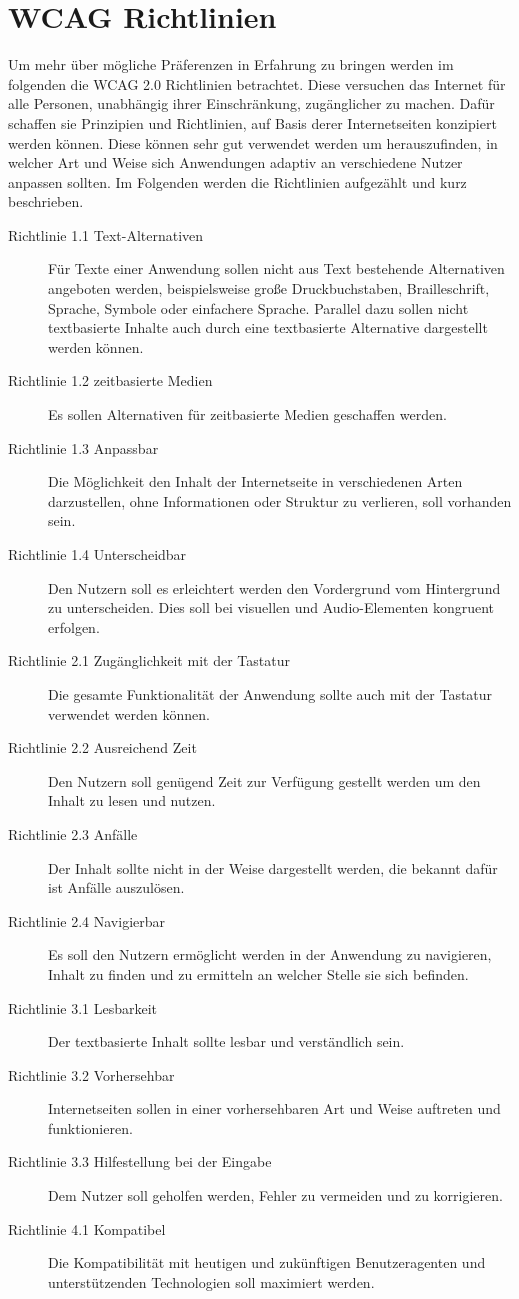 \documentclass[12pt, paper=a4, bibtotoc, toc=listof, headsepline=true, numbers=endperiod]{scrreprt}
\begin{document}
\section{WCAG Richtlinien}
Um mehr über mögliche Präferenzen in Erfahrung zu bringen werden im folgenden die \ac{WCAG 2.0} Richtlinien betrachtet. Diese versuchen das Internet für alle Personen, unabhängig ihrer Einschränkung, zugänglicher zu machen. Dafür schaffen sie Prinzipien und Richtlinien, auf Basis derer Internetseiten konzipiert werden können. Diese können sehr gut verwendet werden um herauszufinden, in welcher Art und Weise sich Anwendungen adaptiv an verschiedene Nutzer anpassen sollten. Im Folgenden werden die Richtlinien aufgezählt und kurz beschrieben\cite{wcag}.
\begin{description}
	\item [Richtlinie 1.1 Text-Alternativen] Für Texte einer Anwendung sollen nicht aus Text bestehende Alternativen angeboten werden, beispielsweise große Druckbuchstaben, Brailleschrift, Sprache, Symbole oder einfachere Sprache. Parallel dazu sollen nicht textbasierte Inhalte auch durch eine textbasierte Alternative dargestellt werden können.
	\item[Richtlinie 1.2 zeitbasierte Medien] Es sollen Alternativen für zeitbasierte Medien geschaffen werden.
	\item[Richtlinie 1.3 Anpassbar] Die Möglichkeit den Inhalt der Internetseite in verschiedenen Arten darzustellen, ohne Informationen oder Struktur zu verlieren, soll vorhanden sein.
	\item[Richtlinie 1.4 Unterscheidbar] Den Nutzern soll es erleichtert werden den Vordergrund vom Hintergrund zu unterscheiden. Dies soll bei visuellen und Audio-Elementen kongruent erfolgen. 
	\item[Richtlinie 2.1 Zugänglichkeit mit der Tastatur] Die gesamte Funktionalität der Anwendung sollte auch mit der Tastatur verwendet werden können.	
	\item[Richtlinie 2.2 Ausreichend Zeit] Den Nutzern soll genügend Zeit zur Verfügung gestellt werden um den Inhalt zu lesen und nutzen.
	\item[Richtlinie 2.3 Anfälle] Der Inhalt sollte nicht in der Weise dargestellt werden, die bekannt dafür ist Anfälle auszulösen.
	\item[Richtlinie 2.4 Navigierbar] Es soll den Nutzern ermöglicht werden in der Anwendung zu navigieren, Inhalt zu finden und zu ermitteln an welcher Stelle sie sich befinden.
	\item[Richtlinie 3.1 Lesbarkeit] Der textbasierte Inhalt sollte lesbar und verständlich sein.	
	\item[Richtlinie 3.2 Vorhersehbar] Internetseiten sollen in einer vorhersehbaren Art und Weise auftreten und funktionieren.
	\item[Richtlinie 3.3 Hilfestellung bei der Eingabe] Dem Nutzer soll geholfen werden, Fehler zu vermeiden und zu korrigieren.
	\item[Richtlinie 4.1 Kompatibel] Die Kompatibilität mit heutigen und zukünftigen Benutzeragenten und unterstützenden Technologien soll maximiert werden.
\end{description}
\end{document}
